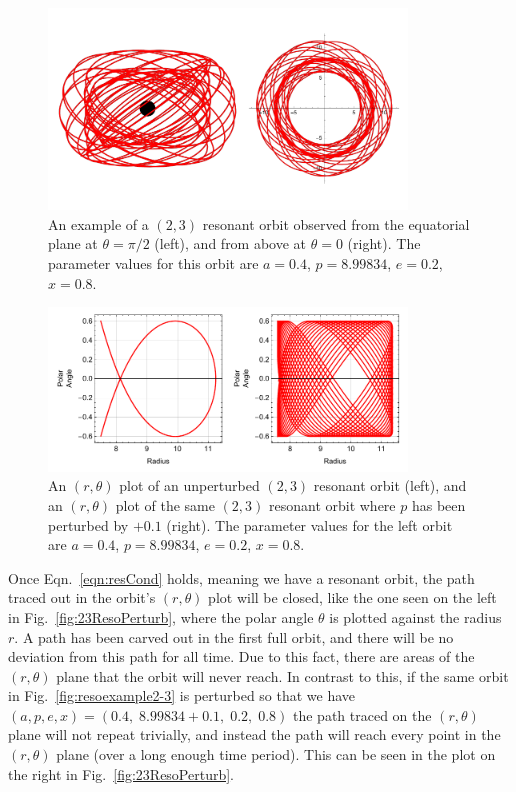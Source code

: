 \begin{figure}[!ht]
    \centering
    \includegraphics[width=0.85\textwidth]{images/resoTopSide.pdf}
    \caption[Resonant orbit example]{An example of a $(2,3)$ resonant orbit observed from the equatorial plane at $\theta=\pi/2$ (left), and from above at $\theta=0$ (right). The parameter values for this orbit are $a=0.4$, $p=8.99834$, $e=0.2$, $x=0.8$.}
    \label{fig:resoexample2-3}
\end{figure}

\begin{figure}[!ht]
    \centering
    \includegraphics[width=0.85\textwidth]{images/resorThPlusPert.pdf}
    \caption[Two $(r,\theta)$ plots showing an unperturbed and a perturbed resonant orbit]{An $(r,\theta)$ plot of an unperturbed  $(2,3)$ resonant orbit (left), and an $(r,\theta)$ plot of the same $(2,3)$ resonant orbit where $p$ has been perturbed by $+0.1$ (right). The parameter values for the left orbit are $a=0.4$, $p=8.99834$, $e=0.2$, $x=0.8$.}
    \label{fig:23ResoPerturb}
\end{figure}

Once Eqn.~\eqref{eqn:resCond} holds, meaning we have a resonant orbit, the path traced out in the orbit's $(r,\theta)$ plot will be closed, like the one seen on the left in Fig.~\eqref{fig:23ResoPerturb}, where the polar angle $\theta$ is plotted against the radius $r$.
A path has been carved out in the first full orbit, and there will be no deviation from this path for all time.
Due to this fact, there are areas of the $(r,\theta)$ plane that the orbit will never reach.
In contrast to this, if the same orbit in Fig.~\eqref{fig:resoexample2-3} is perturbed so that we have $(a,p,e,x)=(0.4,\;8.99834+0.1,\;0.2,\;0.8)$ the path traced on the $(r,\theta)$ plane will not repeat trivially, and instead the path will reach every point in the $(r,\theta)$ plane (over a long enough time period).
This can be seen in the plot on the right in Fig.~\eqref{fig:23ResoPerturb}.

